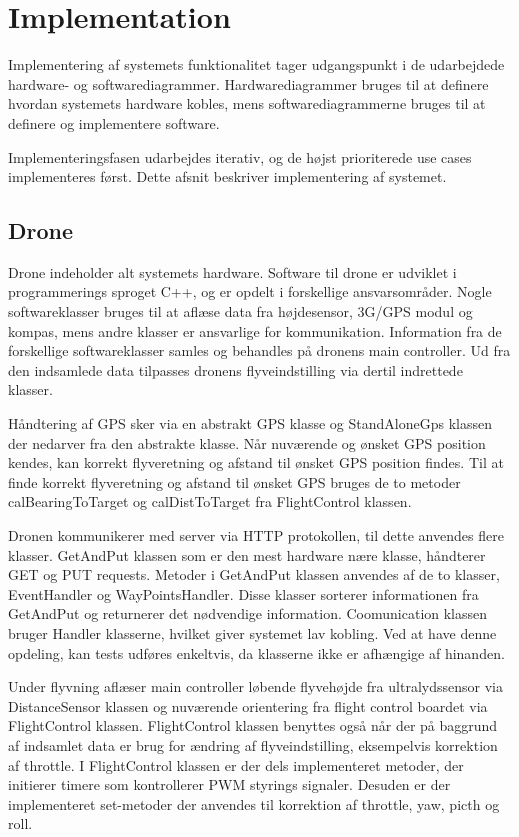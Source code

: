 \section{Implementation}
Implementering af systemets funktionalitet tager udgangspunkt i de udarbejdede hardware- og softwarediagrammer. Hardwarediagrammer bruges til at definere hvordan systemets hardware kobles, mens softwarediagrammerne bruges til at definere og implementere software.

Implementeringsfasen udarbejdes iterativ, og de højst prioriterede use cases implementeres først. 
Dette afsnit beskriver implementering af systemet.

\subsection{Drone}
Drone indeholder alt systemets hardware. Software til drone er udviklet i programmerings sproget C++, og er opdelt i forskellige ansvarsområder. Nogle softwareklasser bruges til at aflæse data fra højdesensor, 3G/GPS modul og kompas, mens andre klasser er ansvarlige for kommunikation. Information fra de forskellige softwareklasser samles og behandles på dronens main controller. Ud fra den indsamlede data tilpasses dronens flyveindstilling via dertil indrettede klasser. 

Håndtering af GPS sker via en abstrakt GPS klasse og StandAloneGps klassen der nedarver fra den abstrakte klasse. Når nuværende og ønsket GPS position kendes, kan korrekt flyveretning og afstand til ønsket GPS position findes. Til at finde korrekt flyveretning og afstand til ønsket GPS bruges de to metoder calBearingToTarget og calDistToTarget fra FlightControl klassen. 

Dronen kommunikerer med server via HTTP protokollen, til dette anvendes flere klasser. GetAndPut klassen som er den mest hardware nære klasse, håndterer GET og PUT requests. Metoder i GetAndPut klassen anvendes af de to klasser, EventHandler og WayPointsHandler. Disse klasser sorterer informationen fra GetAndPut og returnerer det nødvendige information. Coomunication klassen bruger Handler klasserne, hvilket giver systemet lav kobling. Ved at have denne opdeling, kan tests udføres enkeltvis, da klasserne ikke er afhængige af hinanden.

Under flyvning aflæser main controller løbende flyvehøjde fra ultralydssensor via DistanceSensor klassen og nuværende orientering fra flight control boardet via FlightControl klassen. FlightControl klassen benyttes også når der på baggrund af indsamlet data er brug for ændring af flyveindstilling, eksempelvis korrektion af throttle. I FlightControl klassen er der dels implementeret metoder, der initierer timere som kontrollerer PWM styrings signaler. Desuden er der implementeret set-metoder der anvendes til korrektion af throttle, yaw, picth og roll.  

